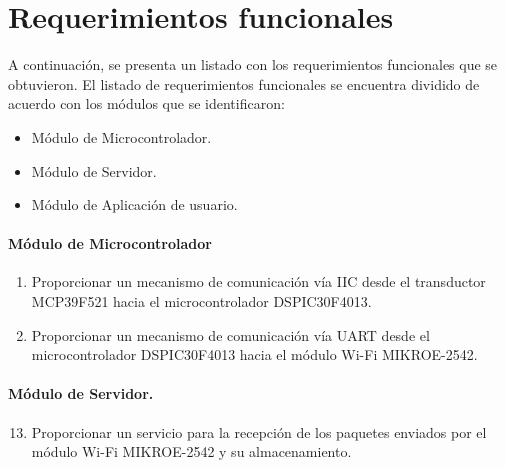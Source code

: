 \section{Requerimientos funcionales}
A continuación, se presenta un listado con los requerimientos funcionales que se obtuvieron.
El listado de requerimientos funcionales se encuentra dividido de acuerdo con los módulos que se identificaron:
\begin{itemize}
	\item Módulo de Microcontrolador.
	\item Módulo de Servidor.
	\item Módulo de Aplicación de usuario.
\end{itemize}

\paragraph{Módulo de Microcontrolador}
\begin{enumerate}[label=RF\arabic*.]
	\item Proporcionar un mecanismo de comunicación vía IIC desde el transductor MCP39F521 hacia el microcontrolador DSPIC30F4013.
	\item Proporcionar un mecanismo de comunicación vía UART desde el microcontrolador DSPIC30F4013 hacia el módulo Wi-Fi MIKROE-2542.
\end{enumerate}

\paragraph{Módulo de Servidor.}
\begin{enumerate}[label=RF\arabic*.]
	\setcounter{enumi}{12}
	\item Proporcionar un servicio para la recepción de los paquetes enviados por el módulo Wi-Fi MIKROE-2542 y su almacenamiento.
	
\end{enumerate}

